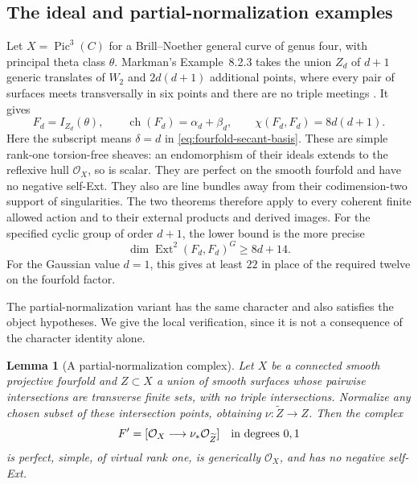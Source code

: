\documentclass[11pt]{article}
\newtheorem{lemma}[theorem]{Lemma}
\theoremstyle{definition}
\theoremstyle{remark}
\begin{document}
\subsection{The ideal and partial-normalization examples}

Let $X=\operatorname{Pic}^3(C)$ for a Brill--Noether general curve
of genus four, with principal theta class $\theta$.  Markman's
Example~8.2.3 takes the union $Z_d$ of $d+1$ generic translates of
$W_2$ and $2d(d+1)$ additional points, where every pair of surfaces
meets transversally in six points and there are no triple meetings
\cite[pp.~52--54]{MarkmanSecantFourfold}.  It gives
\[
 F_d=I_{Z_d}(\theta),\qquad
 \operatorname{ch}(F_d)=\alpha_d+\beta_d,
 \qquad \chi(F_d,F_d)=8d(d+1).
\]
Here the subscript means $\delta=d$ in
\eqref{eq:fourfold-secant-basis}.  These are simple rank-one
torsion-free sheaves: an endomorphism of their ideals extends to
the reflexive hull $\mathcal O_X$, so is scalar.  They are perfect
on the smooth fourfold and have no negative self-Ext.  They also
are line bundles away from their codimension-two support of
singularities.  The two theorems therefore apply to every coherent
finite allowed action and to their external products and derived
images.  For the specified cyclic group of order $d+1$, the lower
bound is the more precise
\[
                 \dim\operatorname{Ext}^2(F_d,F_d)^G\ge8d+14.
\]
For the Gaussian value $d=1$, this gives at least $22$ in place of
the required twelve on the fourfold factor.

The partial-normalization variant has the same character and also
satisfies the object hypotheses.  We give the local verification,
since it is not a consequence of the character identity alone.

\begin{lemma}[A partial-normalization complex]
\label{lem:partial-normalization-gluable}
Let $X$ be a connected smooth projective fourfold and $Z\subset X$
a union of smooth surfaces whose pairwise intersections are
transverse finite sets, with no triple intersections.  Normalize
any chosen subset of these intersection points, obtaining
$\nu:\widetilde Z\to Z$.  Then the complex
\[
       F'=[\mathcal O_X\longrightarrow\nu_*\mathcal O_{\widetilde Z}]
       \quad\hbox{in degrees $0,1$}
\]
is perfect, simple, of virtual rank one, is generically
$\mathcal O_X$, and has no negative self-Ext.
\end{lemma}
\end{document}
